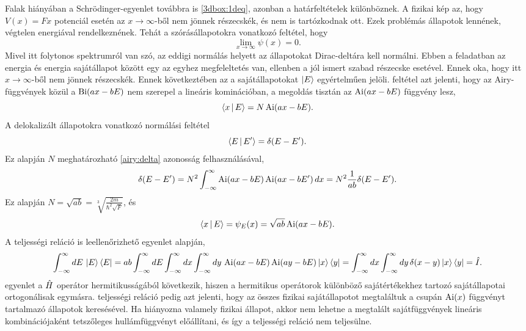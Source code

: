 \label{nowall}
Falak hiányában a Schrödinger-egyenlet továbbra is \eqref{3dbox:1deq}, azonban a határfeltételek különböznek. A fizikai kép az, hogy $V(x)=Fx$ potenciál esetén az $x\to\infty$-ből nem jönnek részecskék, és nem is tartózkodnak ott. Ezek problémás állapotok lennének, végtelen energiával rendelkeznének. Tehát a szórásállapotokra vonatkozó feltétel, hogy
\begin{equation}
	\lim_{x\to\infty}\psi(x) = 0.
	\label{nowall:boundary}
\end{equation}
Mivel itt folytonos spektrumról van szó, az eddigi normálás helyett az állapotokat Dirac-deltára kell normálni. Ebben a feladatban az energia és energia sajátállapot között egy az egyhez megfeleltetés van, ellenben a jól ismert szabad részecske esetével. Ennek oka, hogy itt $x\to\infty$-ből nem jönnek részecskék. Ennek következtében az a sajátállapotokat $\Ket{E}$ egyértelműen jelöli.
 feltétel azt jelenti, hogy az Airy-függvények közül a $\operatorname{Bi}(ax-bE)$ nem szerepel a lineáris kominációban, a megoldás tisztán az $\operatorname{Ai}(ax-bE)$ függvény lesz,
\begin{equation}
	\Braket{x|E}=N\operatorname{Ai}(ax-bE).
\end{equation}
A delokalizált állapotokra vonatkozó normálási feltétel
\begin{equation}
	\Braket{E|E^\prime}=\delta(E-E^\prime).
\end{equation}
Ez alapján $N$ meghatározható \eqref{airy:delta} azonosság felhasználásával,
\begin{dmath}
	\delta(E-E^\prime)=N^2\int_{-\infty}^\infty\Ai(ax-bE)\Ai(ax-bE^\prime)\,dx=N^2\frac{1}{ab}\delta(E-E^\prime).
	\label{nowall:orthog}
\end{dmath}
Ez alapján $N=\sqrt{ab}=\sqrt[3]{\frac{2m}{\hbar^2\sqrt{F}}}$, és
\begin{equation}
	\Braket{x|E}=\psi_E(x)=\sqrt{ab}\operatorname{Ai}(ax-bE).
	\label{nowell:sajátfüggvény}
\end{equation}
A teljességi reláció is leellenőrizhető  egyenlet alapján,
\begin{dmath}
	\int_{-\infty}^\infty dE\,\Ket{E}\Bra{E}=ab\int_{-\infty}^\infty dE\int_{-\infty}^\infty dx\int_{-\infty}^\infty dy\,\Ai(ax-bE)\Ai(ay-bE)\Ket{x}\Bra{y}=\int_{-\infty}^\infty dx\int_{-\infty}^\infty dy\,\delta(x-y)\Ket{x}\Bra{y}=\op{I}.
	\label{nowall:comleteness}
\end{dmath}
 egyenlet a $\hat{H}$ operátor hermitikusságából következik, hiszen a hermitikus operátorok különböző sajátértékekhez tartozó sajátállapotai ortogonálisak egymásra.  teljességi reláció pedig azt jelenti, hogy az összes fizikai sajátállapotot megtaláltuk a csupán $\operatorname{Ai}(x)$ függvényt tartalmazó állapotok keresésével. Ha hiányozna valamely fizikai állapot, akkor nem lehetne a megtalált sajátfüggvények lineáris kombinációjaként tetszőleges hullámfüggvényt előállítani, és így a teljességi reláció nem teljesülne.

